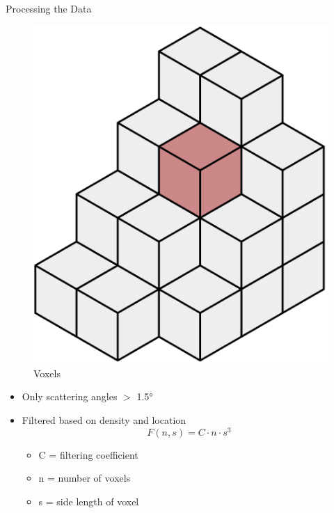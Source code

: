 \documentclass[14pt, aspectratio=169]{beamer}
\begin{document}
\begin{frame}{Processing the Data}
        
     {
        \centering
        \begin{figure}
            \centering
            \includegraphics[scale=0.1]{images/Voxels.svg.png}
            \caption{Voxels \cite{voxel}}
            \label{fig:enter-label}
        \end{figure}
        
    }
     {
        \begin{itemize}[<+->]
            \item<4-> Only scattering angles \(>\) 1.5°
            \item<5-> Filtered based on density and location
            \begin{equation}
                F(n, s) = C \cdot n \cdot s^3
            \end{equation}
            \begin{itemize}
                \item C = filtering coefficient
                \item n = number of voxels
                \item s = side length of voxel
            \end{itemize}
        \end{itemize}
    }

\end{frame}
\end{document}

